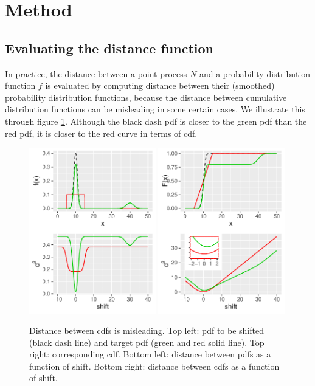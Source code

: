 

\section{Method} \label{sec:method}

\subsection{Evaluating the distance function}
In practice, the distance  between a point process $N$ and a probability distribution function $f$ is 
evaluated by computing distance between their (smoothed) probability distribution functions, because the distance between cumulative distribution functions can be misleading in some certain cases. 
We illustrate this through figure \ref{pic: pdf better}. Although the black dash pdf is closer to the green pdf than the red pdf, it is closer to the red curve in terms of cdf.


\begin{figure}[H]
\includegraphics[width=0.49\textwidth]{../simulation/plots/pdf_vs_cdf_c}
\includegraphics[width=0.49\textwidth]{../simulation/plots/pdf_vs_cdf_d}
\caption{ Distance between cdfs is misleading. Top left: pdf to be shifted (black dash line) and target pdf (green and red solid line). Top right: corresponding cdf. Bottom left: distance between pdfs as a function of shift. Bottom right: distance between cdfs as a function of shift.}
\label{pic: pdf better}
\end{figure}


